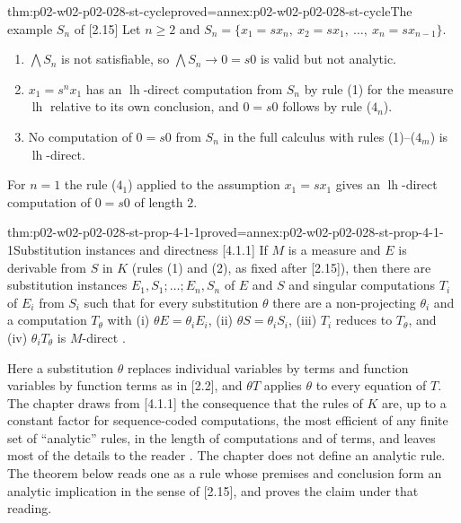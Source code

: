 \begin{hbtheorem}{thm:p02-w02-p02-028-st-cycle}{proved=annex:p02-w02-p02-028-st-cycle}{The example \(S_n\) of [2.15]}
Let \(n\geq2\) and \(S_n=\{x_1=sx_n,\ x_2=sx_1,\ \ldots,\ x_n=sx_{n-1}\}\).
\begin{enumerate}
  \item \(\bigwedge S_n\) is not satisfiable, so \(\bigwedge S_n\to0=s0\) is
        valid but not analytic.
  \item \(x_1=s^nx_1\) has an \(\operatorname{lh}\)-direct computation from
        \(S_n\) by rule (1) for the measure \(\operatorname{lh}\) relative to
        its own conclusion, and \(0=s0\) follows by rule (\(4_n\)).
  \item No computation of \(0=s0\) from \(S_n\) in the full calculus with rules
        (1)--(\(4_m\)) is \(\operatorname{lh}\)-direct.
\end{enumerate}
For \(n=1\) the rule (\(4_1\)) applied to the assumption \(x_1=sx_1\) gives
an \(\operatorname{lh}\)-direct computation of \(0=s0\) of length \(2\).
\end{hbtheorem}

\begin{hbtheorem}{thm:p02-w02-p02-028-st-prop-4-1-1}{proved=annex:p02-w02-p02-028-st-prop-4-1-1}{Substitution instances and directness [4.1.1]}
If \(M\) is a measure and \(E\) is derivable from \(S\) in \(K\) (rules
(1) and (2), as fixed after [2.15]), then there are
substitution instances \(E_1,S_1;\ldots;E_n,S_n\) of \(E\) and \(S\) and
singular computations \(T_i\) of \(E_i\) from \(S_i\) such that for every
substitution \(\theta\) there are a non-projecting \(\theta_i\) and a
computation \(T_\theta\) with
(i) \(\theta E=\theta_iE_i\), (ii) \(\theta S=\theta_iS_i\),
(iii) \(T_i\) reduces to \(T_\theta\), and (iv) \(\theta_iT_\theta\) is
\(M\)-direct \cite[\S4.1.1, pp.~910--911]{Statman1977}.
\end{hbtheorem}

Here a substitution \(\theta\) replaces individual variables by terms and
function variables by function terms as in [2.2], and \(\theta T\) applies
\(\theta\) to every equation of \(T\).  The chapter draws from [4.1.1] the
consequence that the rules of \(K\) are, up to a constant factor for
sequence-coded computations, the most efficient of any finite set of
``analytic'' rules, in the length of computations and of terms, and leaves
most of the details to the reader \cite[\S4.1, p.~910]{Statman1977}.  The
chapter does not define an analytic rule.  The theorem below reads one as a
rule whose premises and conclusion form an analytic implication in the sense
of [2.15], and proves the claim under that reading.

